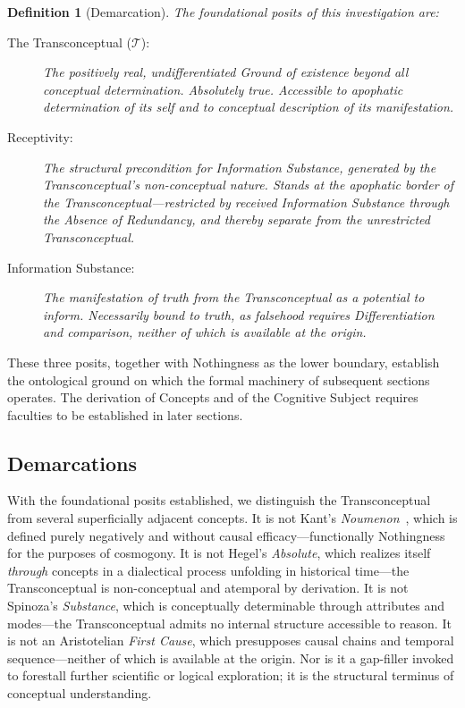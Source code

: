 \documentclass[11pt, a4paper]{article}
\theoremstyle{formalism}
\newtheorem{formalism}{Definition}
\begin{document}
\begin{formalism}[Demarcation]
    The foundational posits of this investigation are:
    \begin{description}
        \item[The Transconceptual ($\mathcal{T}$):] The positively real,
        undifferentiated Ground of existence beyond all conceptual
        determination. Absolutely true. Accessible to apophatic
        determination of its self and to conceptual description of its
        manifestation.

        \item[Receptivity:] The structural precondition for Information
        Substance, generated by the Transconceptual's non-conceptual nature.
        Stands at the apophatic border of the Transconceptual---restricted by
        received Information Substance through the Absence of Redundancy, and
        thereby separate from the unrestricted Transconceptual.

        \item[Information Substance:] The manifestation of truth from the
        Transconceptual as a potential to inform. Necessarily bound to truth,
        as falsehood requires Differentiation and comparison, neither of which
        is available at the origin.
    \end{description}
\end{formalism}

These three posits, together with Nothingness as the lower boundary,
establish the ontological ground on which the formal machinery of subsequent
sections operates. The derivation of Concepts and of the Cognitive Subject
requires faculties to be established in later sections.

\subsection{Demarcations}

With the foundational posits established, we distinguish the Transconceptual
from several superficially adjacent concepts. It is not Kant's
\textit{Noumenon}~\cite{Kant1781}, which is defined purely negatively and
without causal efficacy---functionally Nothingness for the purposes of
cosmogony. It is not Hegel's \textit{Absolute}, which realizes itself
\textit{through} concepts in a dialectical process unfolding in historical
time---the Transconceptual is non-conceptual and atemporal by derivation. It is
not Spinoza's \textit{Substance}, which is conceptually determinable through
attributes and modes---the Transconceptual admits no internal structure
accessible to reason. It is not an Aristotelian \textit{First Cause}, which
presupposes causal chains and temporal sequence---neither of which is available
at the origin. Nor is it a gap-filler invoked to forestall further scientific
or logical exploration; it is the structural terminus of conceptual understanding.
\end{document}
